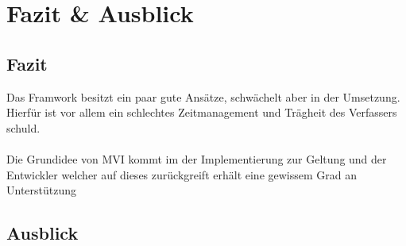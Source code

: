 \section{Fazit \& Ausblick}

\subsection{Fazit}
Das Framwork besitzt ein paar gute Ansätze, schwächelt aber in der Umsetzung. Hierfür ist vor allem ein schlechtes Zeitmanagement und Trägheit des Verfassers schuld.
\\\\
Die Grundidee von MVI kommt im der Implementierung zur Geltung und der Entwickler welcher auf dieses zurückgreift erhält eine gewissem Grad an Unterstützung 

\subsection{Ausblick}